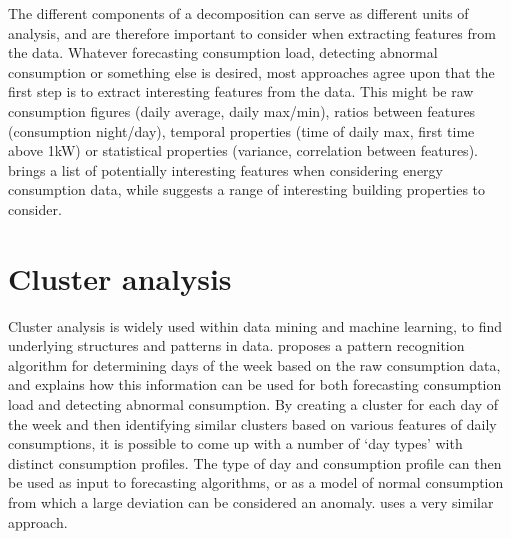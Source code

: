 The different components of a decomposition can serve as different units of analysis, and are therefore important to consider when extracting features from the data. Whatever forecasting consumption load, detecting abnormal consumption or something else is desired, most approaches agree upon that the first step is to extract interesting features from the data. This might be raw consumption figures (daily average, daily max/min), ratios between features (consumption night/day), temporal properties (time of daily max, first time above 1kW) or statistical properties (variance, correlation between features). \cite{Benchmarking1} brings a list of potentially interesting features when considering energy consumption data, while \cite{Benchmarking2} suggests a range of interesting building properties to consider. 
\section{Cluster analysis}
Cluster analysis is widely used within data mining and machine learning, to find underlying structures and patterns in data. \cite{faultdetec4} proposes a pattern recognition algorithm for determining days of the week based on the raw consumption data, and explains how this information can be used for both forecasting consumption load and detecting abnormal consumption. By creating a cluster for each day of the week and then identifying similar clusters based on various features of daily consumptions, it is possible to come up with a number of ‘day types’ with distinct consumption profiles. The type of day and consumption profile can then be used as input to forecasting algorithms, or as a model of normal consumption from which a large deviation can be considered an anomaly. \cite{faultdetec2} uses a very similar approach.

